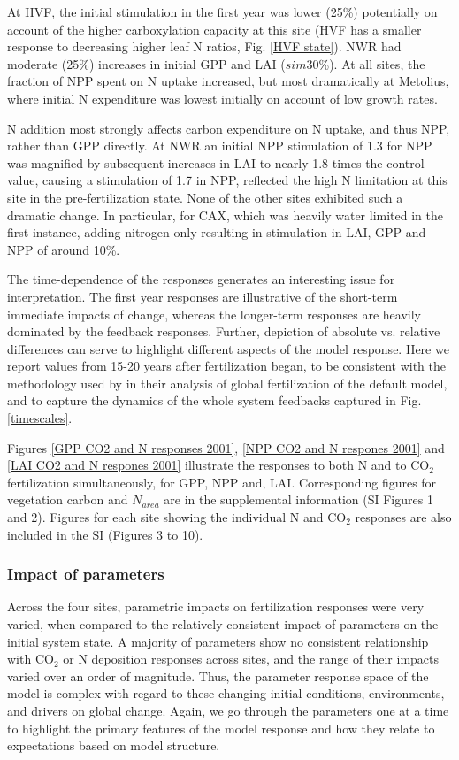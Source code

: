 \usepackage{}\documentclass[draft,linenumbers]{agujournal}
\begin{document}
 At HVF, the initial stimulation in the first year was lower (25\%) potentially on account of the higher carboxylation capacity at this site (HVF has a smaller response to decreasing higher leaf N ratios, Fig. \ref{HVF state}). NWR had moderate (25\%) increases in initial GPP and LAI ($sim$30\%).  At all sites, the fraction of NPP spent on N uptake increased, but most dramatically at Metolius, where initial N expenditure was lowest initially on account of low growth rates. 
 
N addition most strongly affects carbon expenditure on N uptake, and thus NPP, rather than GPP directly. At NWR an initial NPP stimulation of 1.3 for NPP was magnified by subsequent increases in LAI to nearly 1.8 times the control value, causing a stimulation of 1.7 in NPP, reflected the high N limitation at this site in the pre-fertilization state. None of the other sites exhibited such a dramatic change. In particular, for CAX, which was heavily water limited in the first instance, adding nitrogen only resulting in stimulation in LAI, GPP and NPP of around 10\%. 

The time-dependence of the responses generates an interesting issue for interpretation. The first year responses are illustrative of the short-term immediate impacts of change, whereas the longer-term responses are heavily dominated by the feedback responses. Further, depiction of absolute vs. relative differences can serve to highlight different aspects of the model response. Here we report values from 15-20 years after fertilization began, to be consistent with the methodology used by \cite{wieder2019} in their analysis of global fertilization of the default model, and to capture the dynamics of the whole system feedbacks captured in Fig. \ref{timescales}. 

Figures \ref{GPP CO2 and N responses 2001}, \ref{NPP CO2 and N respones 2001} and \ref{LAI CO2 and N respones 2001} illustrate the responses to both N and to CO$_{2}$ fertilization simultaneously, for GPP, NPP and, LAI. Corresponding figures for vegetation carbon and $N_{area}$ are in the supplemental information (SI Figures 1 and 2). Figures for each site showing the individual N and CO$_{2}$ responses are also included in the SI (Figures 3 to 10).

\subsubsection{Impact of parameters}
Across the four sites, parametric impacts on fertilization responses were very varied, when compared to the relatively consistent impact of parameters on the initial system state. A majority of parameters show no consistent relationship with CO$_{2}$ or N deposition responses across sites, and the range of their impacts varied over an order of magnitude. Thus, the parameter response space of the model is complex with regard to these changing initial conditions, environments, and drivers on global change. Again, we go through the parameters one at a time to highlight the primary features of the model response and how they relate to expectations based on model structure. 
\end{document}

